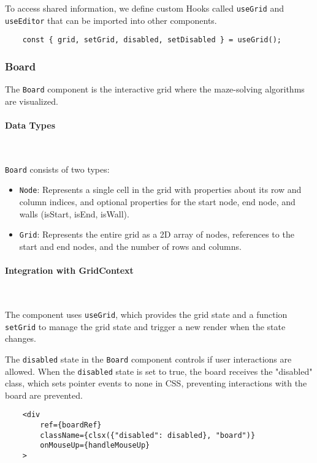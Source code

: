 To access shared information, we define custom Hooks called \texttt{useGrid} and \texttt{useEditor} that can be imported into other components.

\begin{verbatim}
    const { grid, setGrid, disabled, setDisabled } = useGrid();
\end{verbatim}

\subsubsection{Board}
The \texttt{Board} component is the interactive grid where the maze-solving algorithms are visualized.

\paragraph{Data Types} \

\texttt{Board} consists of two types:
\begin{itemize}
    \item \texttt{Node}: Represents a single cell in the grid with properties about its row and column indices, and optional properties for the start node, end node, and walls (isStart, isEnd, isWall).
    \item \texttt{Grid}: Represents the entire grid as a 2D array of nodes, references to the start and end nodes, and the number of rows and columns.
\end{itemize}

\paragraph{Integration with GridContext} \

The component uses \texttt{useGrid}, which provides the grid state and a function \texttt{setGrid} to manage the grid state and trigger a new render when the state changes.

The \texttt{disabled} state in the \texttt{Board} component controls if user interactions are allowed. When the \texttt{disabled} state is set to true, the board receives the "disabled" class, which sets pointer events to none in CSS, preventing interactions with the board are prevented.

\begin{verbatim}
    <div
        ref={boardRef}
        className={clsx({"disabled": disabled}, "board")}
        onMouseUp={handleMouseUp}
    >
\end{verbatim}


